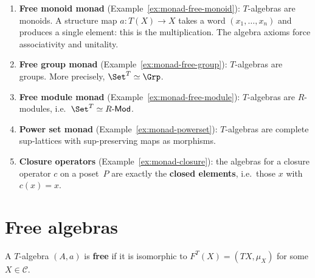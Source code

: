 \begin{example}\label{ex:em-algebras}
\begin{enumerate}[label=(\roman*)]
\item \textbf{Free monoid monad} (Example~\ref{ex:monad-free-monoid}):
    $T$-algebras are monoids.  A structure map $a\colon T(X)\to X$
    takes a word $(x_1,\ldots,x_n)$ and produces a single element:
    this is the multiplication.  The algebra axioms force associativity
    and unitality.

\item \textbf{Free group monad} (Example~\ref{ex:monad-free-group}):
    $T$-algebras are groups.  More precisely,
    $\Set^T\simeq\Grp$.

\item \textbf{Free module monad} (Example~\ref{ex:monad-free-module}):
    $T$-algebras are $R$-modules, i.e.\ $\Set^T\simeq R\text{-}\mathsf{Mod}$.

\item \textbf{Power set monad} (Example~\ref{ex:monad-powerset}):
    $T$-algebras are complete sup-lattices with sup-preserving maps
    as morphisms.

\item \textbf{Closure operators} (Example~\ref{ex:monad-closure}):
    the algebras for a closure operator $c$ on a poset~$P$ are exactly
    the \textbf{closed elements}, i.e.\ those $x$ with $c(x) = x$.
\end{enumerate}
\end{example}


\section{Free algebras}\label{sec:free-algebras}

\begin{definition}\label{def:free-algebra}
A $T$-algebra $(A,a)$ is \textbf{free} if it is isomorphic to
$F^T(X) = (TX,\mu_X)$ for some $X\in\mathcal{C}$.
\end{definition}

